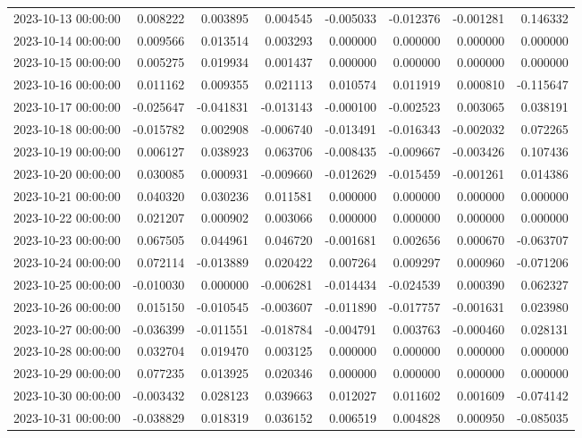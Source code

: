 \begin{tabular}{lrrrrrrr}
2023-10-13 00:00:00 & 0.008222 & 0.003895 & 0.004545 & -0.005033 & -0.012376 & -0.001281 & 0.146332 \\
2023-10-14 00:00:00 & 0.009566 & 0.013514 & 0.003293 & 0.000000 & 0.000000 & 0.000000 & 0.000000 \\
2023-10-15 00:00:00 & 0.005275 & 0.019934 & 0.001437 & 0.000000 & 0.000000 & 0.000000 & 0.000000 \\
2023-10-16 00:00:00 & 0.011162 & 0.009355 & 0.021113 & 0.010574 & 0.011919 & 0.000810 & -0.115647 \\
2023-10-17 00:00:00 & -0.025647 & -0.041831 & -0.013143 & -0.000100 & -0.002523 & 0.003065 & 0.038191 \\
2023-10-18 00:00:00 & -0.015782 & 0.002908 & -0.006740 & -0.013491 & -0.016343 & -0.002032 & 0.072265 \\
2023-10-19 00:00:00 & 0.006127 & 0.038923 & 0.063706 & -0.008435 & -0.009667 & -0.003426 & 0.107436 \\
2023-10-20 00:00:00 & 0.030085 & 0.000931 & -0.009660 & -0.012629 & -0.015459 & -0.001261 & 0.014386 \\
2023-10-21 00:00:00 & 0.040320 & 0.030236 & 0.011581 & 0.000000 & 0.000000 & 0.000000 & 0.000000 \\
2023-10-22 00:00:00 & 0.021207 & 0.000902 & 0.003066 & 0.000000 & 0.000000 & 0.000000 & 0.000000 \\
2023-10-23 00:00:00 & 0.067505 & 0.044961 & 0.046720 & -0.001681 & 0.002656 & 0.000670 & -0.063707 \\
2023-10-24 00:00:00 & 0.072114 & -0.013889 & 0.020422 & 0.007264 & 0.009297 & 0.000960 & -0.071206 \\
2023-10-25 00:00:00 & -0.010030 & 0.000000 & -0.006281 & -0.014434 & -0.024539 & 0.000390 & 0.062327 \\
2023-10-26 00:00:00 & 0.015150 & -0.010545 & -0.003607 & -0.011890 & -0.017757 & -0.001631 & 0.023980 \\
2023-10-27 00:00:00 & -0.036399 & -0.011551 & -0.018784 & -0.004791 & 0.003763 & -0.000460 & 0.028131 \\
2023-10-28 00:00:00 & 0.032704 & 0.019470 & 0.003125 & 0.000000 & 0.000000 & 0.000000 & 0.000000 \\
2023-10-29 00:00:00 & 0.077235 & 0.013925 & 0.020346 & 0.000000 & 0.000000 & 0.000000 & 0.000000 \\
2023-10-30 00:00:00 & -0.003432 & 0.028123 & 0.039663 & 0.012027 & 0.011602 & 0.001609 & -0.074142 \\
2023-10-31 00:00:00 & -0.038829 & 0.018319 & 0.036152 & 0.006519 & 0.004828 & 0.000950 & -0.085035 \\

\end{tabular}
